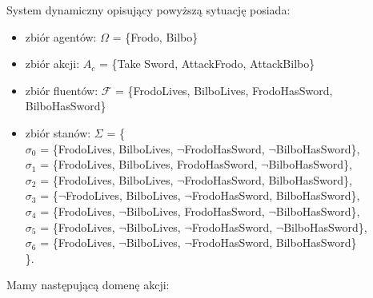 \documentclass[11pt,a4paper]{article}
\begin{document}
    System dynamiczny opisujący powyższą sytuację posiada:
    \begin{itemize}
    \item zbiór agentów: $\Omega$ = \{Frodo, Bilbo\}
    \item zbiór akcji: $A_c$ = \{Take Sword, AttackFrodo, AttackBilbo\}
    \item zbiór fluentów: $\mathcal{F}$ = \{FrodoLives, BilboLives, FrodoHasSword, BilboHasSword\}
    \item zbiór stanów: $\Sigma$ = \{\\
    	$\sigma_0$ = \{FrodoLives, BilboLives, $\neg$FrodoHasSword, $\neg$BilboHasSword\},\\
    	$\sigma_1$ = \{FrodoLives, BilboLives, FrodoHasSword, $\neg$BilboHasSword\},\\
    	$\sigma_2$ = \{FrodoLives, BilboLives, $\neg$FrodoHasSword, BilboHasSword\},\\
    	$\sigma_3$ = \{$\neg$FrodoLives, BilboLives, $\neg$FrodoHasSword, BilboHasSword\},\\
    	$\sigma_4$ = \{FrodoLives, $\neg$BilboLives, FrodoHasSword, $\neg$BilboHasSword\},\\
    	$\sigma_5$ = \{FrodoLives, $\neg$BilboLives, $\neg$FrodoHasSword, $\neg$BilboHasSword\},\\
    	$\sigma_6$ = \{FrodoLives, $\neg$BilboLives, $\neg$FrodoHasSword, BilboHasSword\}\\
    \}.
    \end{itemize}
    Mamy następującą domenę akcji:
    
\end{document}
